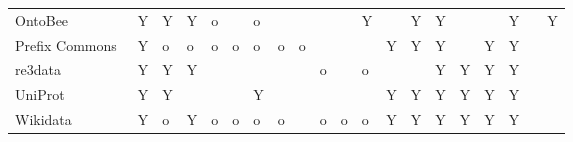 \begin{table}
\begin{tabular}{llllllllllllllllllll}
                 OntoBee~\cite{Ong2017} &              Y &        Y &     Y &          o &            &        o &                &               &         &         &       Y &                            &         Y &                 Y &                    &               &               Y &                &             Y \\
    Prefix Commons~\cite{prefixcommons} &              Y &        o &     o &          o &          o &        o &              o &             o &         &         &         &                          Y &         Y &                 Y &                    &             Y &               Y &                &               \\
              re3data~\cite{Pampel2013} &              Y &        Y &     Y &            &            &          &                &               &       o &         &       o &                            &           &                 Y &                  Y &             Y &               Y &                &               \\
             UniProt~\cite{Bateman2021} &              Y &        Y &       &            &            &        Y &                &               &         &         &         &                          Y &         Y &                 Y &                  Y &             Y &               Y &                &               \\
        Wikidata~\cite{Waagmeester2020} &              Y &        o &     Y &          o &          o &        o &              o &               &       o &       o &       o &                          Y &         Y &                 Y &                  Y &             Y &               Y &                &               \\
\bottomrule
\end{tabular}
\end{table}
